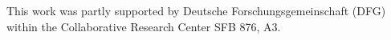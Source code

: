 \documentclass[bimj,fleqn]{w-art}
\theoremstyle{plain}
\theoremstyle{definition}
\begin{document}



\begin{acknowledgement}
This work was partly supported by Deutsche Forschungsgemeinschaft (DFG) within the Collaborative Research Center SFB 876, A3.
\end{acknowledgement}
\vspace*{1pc}



\end{document}
